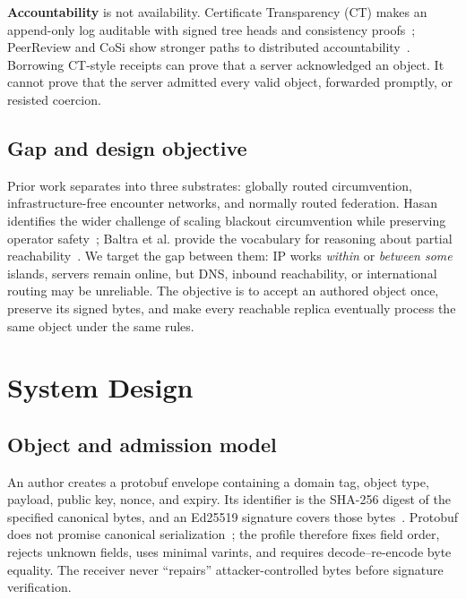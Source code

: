\documentclass[sigconf,anonymous]{acmart}
\begin{document}
\textbf{Accountability} is not availability. Certificate Transparency (CT) makes an append-only log
auditable with signed tree heads and consistency proofs~\cite{rfc6962,rfc9162}; PeerReview and CoSi
show stronger paths to distributed accountability~\cite{haeberlen2007peerreview,syta2016cosi}.
Borrowing CT-style receipts can prove that a server acknowledged an object. It cannot prove that the
server admitted every valid object, forwarded promptly, or resisted coercion.

\subsection{Gap and design objective}

Prior work separates into three substrates: globally routed circumvention, infrastructure-free
encounter networks, and normally routed federation. Hasan identifies the wider challenge of scaling
blackout circumvention while preserving operator safety~\cite{hasan2013dissent}; Baltra et al. provide
the vocabulary for reasoning about partial reachability~\cite{baltra2024connectivity}. We target the
gap between them: IP works \emph{within} or \emph{between some} islands, servers remain online, but
DNS, inbound reachability, or international routing may be unreliable. The objective is to accept an
authored object once, preserve its signed bytes, and make every reachable replica eventually process
the same object under the same rules.

\section{System Design}
\label{sec:design}

\subsection{Object and admission model}

An author creates a protobuf envelope containing a domain tag, object type, payload, public key,
nonce, and expiry. Its identifier is the SHA-256 digest of the specified canonical bytes, and an
Ed25519 signature covers those bytes~\cite{bernstein2012ed25519}. Protobuf does not promise canonical
serialization~\cite{protobufnotcanonical}; the profile therefore fixes field order, rejects unknown
fields, uses minimal varints, and requires decode--re-encode byte equality. The receiver never
``repairs'' attacker-controlled bytes before signature verification.
\end{document}
